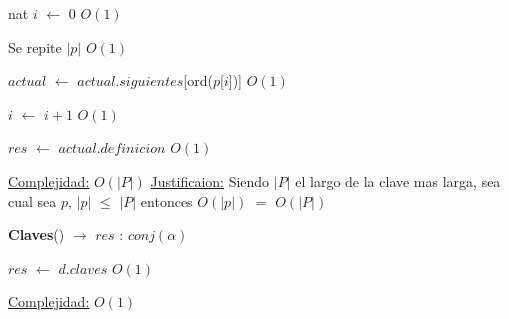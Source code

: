 \begin{Algoritmos}
\begin{algorithm}[H]
\begin{algorithmic}[1]
\State nat $i$ $\gets$ $0$ \Comment $O(1)$


   \Comment Se repite $|p|$ $O(1)$
		

	\State $actual$ $\gets$ $actual$.$siguientes$[ord($p$[$i$])] \Comment $O(1)$

	\State $i$ $\gets$ $i + 1$ \Comment $O(1)$
\EndWhile 


\State $res$ $\gets$ $actual$.$definicion$ \Comment $O(1)$ 

\medskip
\State \underline{Complejidad:} $O(|P|)$
\State \underline{Justificaion:} Siendo $|P|$ el largo de la clave mas larga, sea cual sea $p$, $|p|$ $\leq$ $|P|$ entonces 	$O(|p|)$ $=$ $O(|P|)$

\end{algorithmic}
\end{algorithm}
  
\begin{algorithm}[H]
{\textbf{Claves}(}) $\to$ $res$ : $conj(\alpha)$
\begin{algorithmic}[1]

\State $res$ $\gets$ $d$.$claves$ \Comment $O(1)$

\medskip
\State \underline{Complejidad:} $O(1)$

\end{algorithmic}
\end{algorithm}
  
  
\end{Algoritmos}

